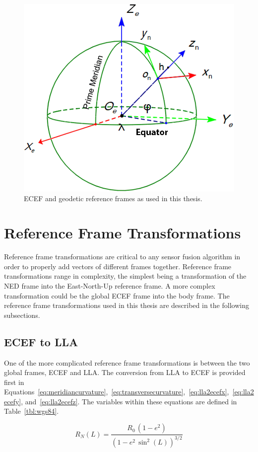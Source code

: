 \begin{figure}[!ht]
    \centering
    \includegraphics[width=0.75\linewidth]{Figures/globalframe.png}
    \caption{ECEF and geodetic reference frames as used in this thesis.}\label{fig:globalframes}
\end{figure}

\clearpage
\section{\textbf{Reference Frame Transformations}}
Reference frame transformations are critical to any sensor fusion algorithm in order to properly add vectors of different frames together. Reference frame transformations range in complexity, the simplest being a transformation of the NED frame into the East-North-Up reference frame. A more complex transformation could be the global ECEF frame into the body frame. The reference frame transformations used in this thesis are described in the following subsections.

\subsection{\textbf{ECEF to LLA}}

One of the more complicated reference frame transformations is between the two global frames, ECEF and LLA\@. The conversion from LLA to ECEF is provided first in Equations~\ref{eq:meridiancurvature},~\ref{eq:transversecurvature},~\ref{eq:lla2ecefx},~\ref{eq:lla2ecefy}, and~\ref{eq:lla2ecefz}. The variables within these equations are defined in Table~\ref{tbl:wgs84}.

\begin{equation}\label{eq:meridiancurvature}
    R_N (L) = \frac{R_0 \, \left(1 - e^2\right)}{{\left(1 - e^2 \, \sin^2 {\left(L\right)}\right)}^{3/2}}
\end{equation}

